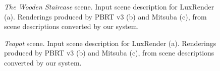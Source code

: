 \begin{figure}[h!t]
{		\label{staircase_Mitsuba}
	}
	\caption{\textit{The Wooden Staircase} scene. Input scene description for LuxRender (a).
		Renderings produced by PBRT v3 (b) and Mitsuba (c),
		from scene descriptions converted by our system. }
	\label{fig:staircase}
\end{figure}

\begin{figure}
  \centering
  \caption{\textit{Teapot} scene. Input scene description for LuxRender (a). Renderings produced by PBRT v3 (b) and Mitsuba (c), from scene descriptions converted by our system.}
  \label{fig:teapot}
\end{figure}


